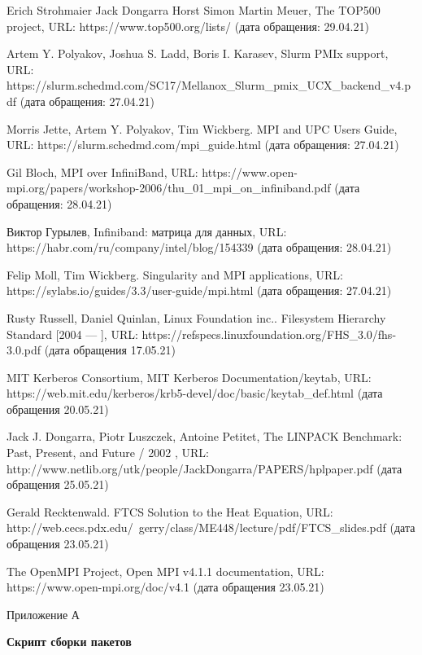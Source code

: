 \documentclass[a4paper]{extarticle}
\begin{document}
\begin{thebibliography}{99}
Erich Strohmaier Jack Dongarra Horst Simon Martin Meuer, The TOP500 project,
URL: https://www.top500.org/lists/ (дата обращения: 29.04.21)


Artem Y. Polyakov, Joshua S. Ladd, Boris I. Karasev, Slurm PMIx support,
URL: https://slurm.schedmd.com/SC17/Mellanox\_Slurm\_pmix\_UCX\_backend\_v4.pdf (дата обращения: 27.04.21)

Morris Jette, Artem Y. Polyakov,  Tim Wickberg. MPI and UPC Users Guide,
URL: https://slurm.schedmd.com/mpi\_guide.html (дата обращения: 27.04.21)

Gil Bloch, MPI over InfiniBand,
URL: https://www.open-mpi.org/papers/workshop-2006/thu\_01\_mpi\_on\_infiniband.pdf (дата обращения: 28.04.21)

Виктор Гурылев, Infiniband: матрица для данных,
URL: https://habr.com/ru/company/intel/blog/154339 (дата обращения: 28.04.21)

Felip Moll,  Tim Wickberg. Singularity and MPI applications,
URL: https://sylabs.io/guides/3.3/user-guide/mpi.html (дата обращения: 27.04.21)

Rusty Russell, Daniel Quinlan, Linux Foundation inc.. Filesystem Hierarchy Standard [2004 --- ],
URL: https://refspecs.linuxfoundation.org/FHS\_3.0/fhs-3.0.pdf (дата обращения 17.05.21)

MIT Kerberos Consortium, MIT Kerberos Documentation/keytab,
URL: https://web.mit.edu/kerberos/krb5-devel/doc/basic/keytab\_def.html (дата обращения 20.05.21)

Jack J. Dongarra, Piotr Luszczek, Antoine Petitet, The LINPACK Benchmark: Past, Present, and Future / 2002 ,
URL: http://www.netlib.org/utk/people/JackDongarra/PAPERS/hplpaper.pdf (дата обращения 25.05.21)

Gerald Recktenwald. FTCS Solution to  the Heat Equation,
URL: http://web.cecs.pdx.edu/~gerry/class/ME448/lecture/pdf/FTCS\_slides.pdf (дата
обращения 23.05.21)

The OpenMPI Project, Open MPI v4.1.1 documentation,
URL: https://www.open-mpi.org/doc/v4.1 (дата обращения 23.05.21)
\end{thebibliography}

\newpage

\begin{flushright}Приложение А\end{flushright}
\centerline{\textbf{Скрипт сборки пакетов}}
\end{document}

